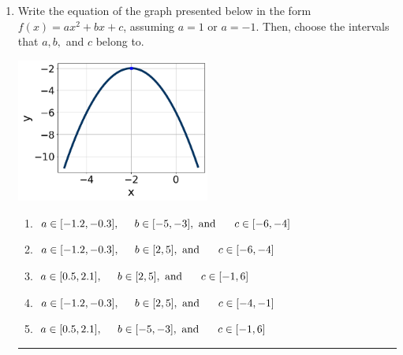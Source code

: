 \documentclass[14pt]{extbook}
\newcommand{\litem}[1]{\item#1\hspace*{-1cm}\rule{\textwidth}{0.4pt}}
\begin{document}
\begin{enumerate}
\litem{
Write the equation of the graph presented below in the form $f(x)=ax^2+bx+c$, assuming  $a=1$ or $a=-1$. Then, choose the intervals that $a, b,$ and $c$ belong to.
\begin{center}
    \includegraphics[width=0.5\textwidth]{../Figures/quadraticGraphToEquationCopyC.png}
\end{center}
\begin{enumerate}[label=\Alph*.]
\item \( a \in [-1.2, -0.3], \hspace*{5mm} b \in [-5, -3], \text{ and } \hspace*{5mm} c \in [-6, -4] \)
\item \( a \in [-1.2, -0.3], \hspace*{5mm} b \in [2, 5], \text{ and } \hspace*{5mm} c \in [-6, -4] \)
\item \( a \in [0.5, 2.1], \hspace*{5mm} b \in [2, 5], \text{ and } \hspace*{5mm} c \in [-1, 6] \)
\item \( a \in [-1.2, -0.3], \hspace*{5mm} b \in [2, 5], \text{ and } \hspace*{5mm} c \in [-4, -1] \)
\item \( a \in [0.5, 2.1], \hspace*{5mm} b \in [-5, -3], \text{ and } \hspace*{5mm} c \in [-1, 6] \)


\end{enumerate}}
\end{enumerate}
\end{document}
